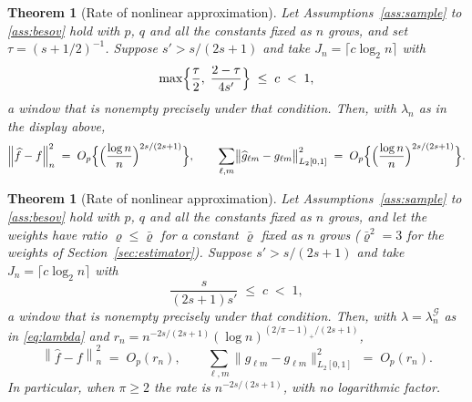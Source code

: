 \documentclass[12pt]{article} %
\newtheorem{theorem}{Theorem}
\theoremstyle{definition}
\theoremstyle{plain}
\newtheorem*{theoremold}{Theorem}
\newcommand{\normn}[1]{\left\lVert #1 \right\rVert_{n}}
\newcommand{\cv}{\ell}
\newcommand{\md}{m}
\newcommand{\gcomp}[2]{g_{#1#2}}
\newcommand{\pen}{\lambda}
\newcommand{\penn}{\lambda_{n}}
\newcommand{\seff}{s'}
\newcommand{\lamG}{\lambda^{\mathcal{G}}_{n}}
\newcommand{\removedk}{\par\noindent[removed in k = 4]\par}
\begin{document}
{\color{gray}\removedk
\begin{theoremold}[Rate of nonlinear approximation]
Let Assumptions~\ref{ass:sample} to \ref{ass:besov} hold with $p$, $q$ and all
the constants fixed as $n$ grows, and set $\tau = (s+1/2)^{-1}$. Suppose
$\seff > s/(2s+1)$ and take $J_n = \lceil c \log_2 n\rceil$ with
\[
  \max\Bigl\{\frac{\tau}{2},\; \frac{2-\tau}{4\seff}\Bigr\}
  \;\le\; c \;<\; 1 ,
\]
a window that is nonempty precisely under that condition. Then, with $\penn$
as in the display above,
\[
  \normn{\widehat{f}-f}^{2}
  \;=\; O_p\Bigl\{\Bigl(\frac{\log n}{n}\Bigr)^{2s/(2s+1)}\Bigr\},
  \qquad
  \sum_{\cv,\md}\bigl\lVert \widehat{g}_{\cv\md}-\gcomp{\cv}{\md}
  \bigr\rVert_{L_2[0,1]}^{2}
  \;=\; O_p\Bigl\{\Bigl(\frac{\log n}{n}\Bigr)^{2s/(2s+1)}\Bigr\} .
\]
\end{theoremold}
}
{\color{colR1}
\begin{theorem}[Rate of nonlinear approximation]
\label{thm:main}
Let Assumptions~\ref{ass:sample} to \ref{ass:besov} hold with $p$, $q$ and all
the constants fixed as $n$ grows, and let the weights have ratio
$\varrho \le \bar\varrho$ for a constant $\bar\varrho$ fixed as $n$ grows
($\bar\varrho^{2} = 3$ for the weights of Section~\ref{sec:estimator}). Suppose
$\seff > s/(2s+1)$ and take $J_n = \lceil c \log_2 n\rceil$ with
\begin{equation}
  \label{eq:window}
  \frac{s}{(2s+1)\seff} \;\le\; c \;<\; 1 ,
\end{equation}
a window that is nonempty precisely under that condition. Then, with
$\pen = \lamG$ as in \eqref{eq:lambda} and
$r_n = n^{-2s/(2s+1)}(\log n)^{(2/\pi-1)_{+}/(2s+1)}$,
\[
  \normn{\widehat{f}-f}^{2} \;=\; O_p(r_n),
  \qquad
  \sum_{\cv,\md}\bigl\lVert \widehat{g}_{\cv\md}-\gcomp{\cv}{\md}
  \bigr\rVert_{L_2[0,1]}^{2} \;=\; O_p(r_n) .
\]
In particular, when $\pi \ge 2$ the rate is $n^{-2s/(2s+1)}$, with no
logarithmic factor.
\end{theorem}
}
\end{document}
